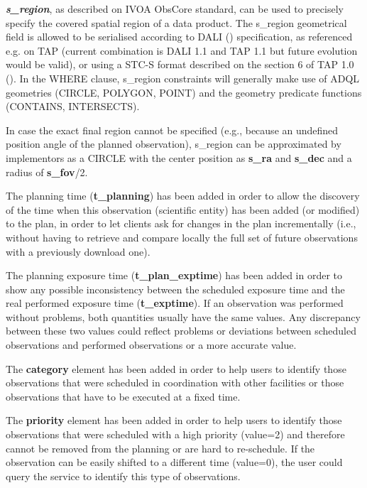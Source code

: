 \documentclass[11pt,a4paper]{ivoa}
\begin{document}
\textbf{\textit{s\_region}}, as described on IVOA ObsCore standard, can be
used to precisely specify the covered spatial region of a data product. The
s\_region geometrical field is allowed to be serialised according to DALI
(\citealt{std:DALI11}) specification, as referenced e.g. on TAP (current combination is DALI 1.1 and TAP 1.1 but future evolution would be valid), 
or using a STC-S format described on the section 6 of TAP 1.0 
(\citealt{2011ivoa.spec.1028T}). In the WHERE clause, s\_region constraints will generally make use of ADQL geometries (CIRCLE, POLYGON, POINT) and the geometry predicate functions (CONTAINS, INTERSECTS).

In case the exact final region cannot be specified (e.g., because an undefined
position angle of the planned observation), s\_region can be approximated by
implementors as a CIRCLE with the center position as \textbf{s\_ra} and
\textbf{s\_dec} and a radius of \textbf{s\_fov}/2.

The planning time (\textbf{t\_planning}) has been added in order to allow the
discovery of the time when this observation (scientific entity) has been added
(or modified) to the plan, in order to let clients ask for changes in the plan
incrementally (i.e., without having to retrieve and compare locally the full set
of future observations with a previously download one).

The planning exposure time (\textbf{t\_plan\_exptime}) has been added in order
to show any possible inconsistency between the scheduled exposure time and the
real performed exposure time (\textbf{t\_exptime}). If an observation was
performed without problems, both quantities usually have the same values. Any
discrepancy between these two values could reflect problems or deviations between
scheduled observations and performed observations or a more accurate value.

The \textbf{category} element has been added in order to help users to identify
those observations that were scheduled in coordination with other facilities or
those observations that have to be executed at a fixed time.

The \textbf{priority} element has been added in order to help users to identify
those observations that were scheduled with a high priority (value=2) and
therefore cannot be removed from the planning or are hard to re-schedule. If the
observation can be easily shifted to a different time (value=0), the user could
query the service to identify this type of observations.
\end{document}
